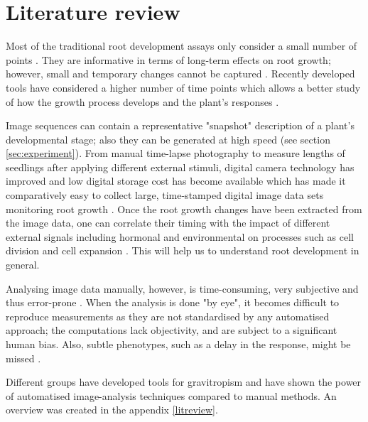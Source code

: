 \section{Literature review}

Most of the traditional root development assays only consider a small number of points \cite{parry2001novel,french2009high}. They are informative in terms of long-term effects on root growth; however, small and temporary changes cannot be captured \cite{parry2001novel}.
Recently developed tools have considered a higher number of time points which allows a better study of how the growth process develops and the plant's responses \cite{french2009high,ishikawa1997novel,van2003new,chavarria2008spatio,miller2007computer}.

Image sequences can contain a representative "snapshot" description of a plant's developmental stage; also they can be generated at high speed (see section \ref{sec:experiment}). From manual time-lapse photography \cite{van1934einfluss,michener1938action} to measure lengths of seedlings after applying different external stimuli, digital camera  technology has improved and low digital storage cost has become available which has made it comparatively easy to collect large, time-stamped digital image data sets monitoring root growth \cite{french2009high}.
Once the root growth changes have been extracted from the image data, one can correlate their timing with the impact of different external signals including hormonal and environmental on processes such as cell division and cell expansion \cite{french2009high}. This will help us to understand root development in general. 

Analysing image data manually, however, is time-consuming, very subjective and thus error-prone \cite{french2009high}. When the analysis is done "by eye", it becomes difficult to reproduce measurements as they are not standardised by any automatised approach; the computations lack objectivity, and are subject to a significant human bias. Also, subtle phenotypes, such as a delay in the response, might be missed \cite{french2009high}. 

Different groups have developed tools for gravitropism and have shown the power of automatised image-analysis techniques compared to manual methods. An overview was created in the appendix \ref{litreview}.


